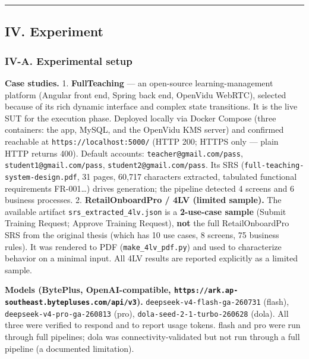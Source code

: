 \documentclass[
]{article}
\begin{document}
\begin{center}\rule{0.5\linewidth}{0.5pt}\end{center}

\subsection{IV. Experiment}\label{iv.-experiment}

\subsubsection{IV-A. Experimental setup}\label{iv-a.-experimental-setup}

\textbf{Case studies.} 1. \textbf{FullTeaching} --- an open-source
learning-management platform (Angular front end, Spring back end,
OpenVidu WebRTC), selected because of its rich dynamic interface and
complex state transitions. It is the live SUT for the execution phase.
Deployed locally via Docker Compose (three containers: the app, MySQL,
and the OpenVidu KMS server) and confirmed reachable at
\texttt{https://localhost:5000/} (HTTP 200; HTTPS only --- plain HTTP
returns 400). Default accounts: \texttt{teacher@gmail.com/pass},
\texttt{student1@gmail.com/pass}, \texttt{student2@gmail.com/pass}. Its
SRS (\texttt{full-teaching-system-design.pdf}, 31 pages, 60,717
characters extracted, tabulated functional requirements FR-001\ldots)
drives generation; the pipeline detected 4 screens and 6 business
processes. 2. \textbf{RetailOnboardPro / 4LV (limited sample).} The
available artifact \texttt{srs\_extracted\_4lv.json} is a
\textbf{2-use-case sample} (Submit Training Request; Approve Training
Request), \textbf{not} the full RetailOnboardPro SRS from the original
thesis (which has 10 use cases, 8 screens, 75 business rules). It was
rendered to PDF (\texttt{make\_4lv\_pdf.py}) and used to characterize
behavior on a minimal input. All 4LV results are reported explicitly as
a limited sample.

\textbf{Models (BytePlus, OpenAI-compatible,
\texttt{https://ark.ap-southeast.bytepluses.com/api/v3}).}
\texttt{deepseek-v4-flash-ga-260731} (flash),
\texttt{deepseek-v4-pro-ga-260813} (pro),
\texttt{dola-seed-2-1-turbo-260628} (dola). All three were verified to
respond and to report usage tokens. flash and pro were run through full
pipelines; dola was connectivity-validated but not run through a full
pipeline (a documented limitation).
\end{document}
